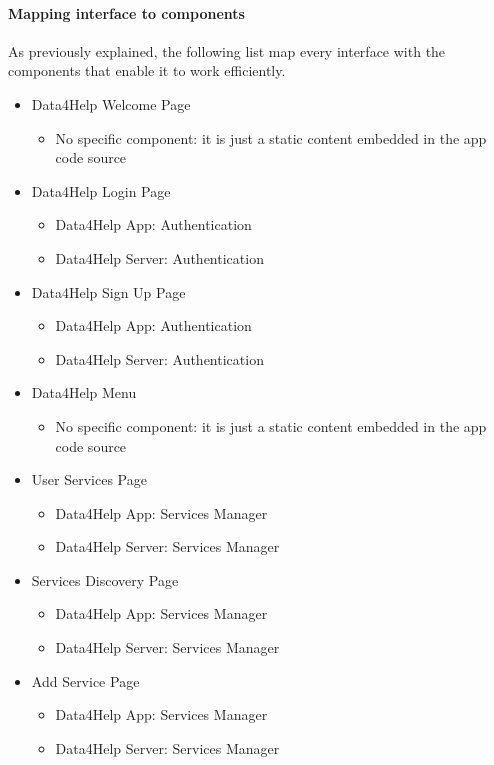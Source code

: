 \documentclass[../DD.tex]{subfiles}
\begin{document}
	\paragraph{Mapping interface to components} As previously explained, the following list map every interface with the components that enable it to work efficiently.
	\begin{itemize}
		\item Data4Help Welcome Page
			\begin{itemize}\item{No specific component: it is just a static content embedded in the app code source}\end{itemize}
		\item Data4Help Login Page
			\begin{itemize}\item{Data4Help App: Authentication}\item{Data4Help Server: Authentication}\end{itemize}
		\item Data4Help Sign Up Page
			\begin{itemize}\item{Data4Help App: Authentication}\item{Data4Help Server: Authentication}\end{itemize}
		\item Data4Help Menu
			\begin{itemize}\item{No specific component: it is just a static content embedded in the app code source}\end{itemize}
		\item User Services Page	
			\begin{itemize}\item{Data4Help App: Services Manager} \item{Data4Help Server: Services Manager}\end{itemize}	
		\item Services Discovery Page			
			\begin{itemize}\item{Data4Help App: Services Manager} \item{Data4Help Server: Services Manager}\end{itemize}	
		\item Add Service Page
			\begin{itemize}\item{Data4Help App: Services Manager} \item{Data4Help Server: Services Manager}\end{itemize}

\end{itemize}
\end{document}
